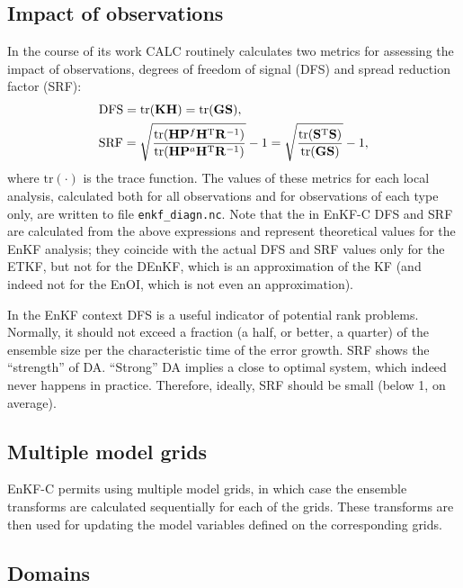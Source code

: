 \documentclass[11pt]{report}
\newcommand{\mb} {\mathbf}
\newcommand{\T}{^{\tiny \mathrm T}}
\begin{document}
\subsection{Impact of observations}
\label{sec:impact}

In the course of its work CALC routinely calculates two metrics for assessing the impact of observations, degrees of freedom of signal (DFS) and spread reduction factor (SRF):
\begin{align*}
  & \mathrm{DFS} = \mathrm{tr}(\mb K \mb H) = \mathrm{tr}(\mb G \mb S), \\
  & \mathrm{SRF} = \sqrt{\frac{\mathrm{tr}(\mb H \mb P^f \mb H\T \mb R^{-1})}{\mathrm{tr}(\mb H \mb P^a \mb H\T \mb R^{-1})}} - 1 = \sqrt{\frac{\mathrm{tr}(\mb S\T \mb S)}{\mathrm{tr}(\mb G \mb S)}} - 1,
\end{align*}
where $\mathrm{tr}(\cdot)$ is the trace function.
The values of these metrics for each local analysis, calculated both for all observations and for observations of each type only, are written to file \verb|enkf_diagn.nc|.
Note that the in EnKF-C DFS and SRF are calculated from the above expressions and represent theoretical values for the EnKF analysis; they coincide with the actual DFS and SRF values only for the ETKF, but not for the DEnKF, which is an approximation of the KF (and indeed not for the EnOI, which is not even an approximation).

In the EnKF context DFS is a useful indicator of potential rank problems.
Normally, it should not exceed a fraction (a half, or better, a quarter) of the ensemble size per the characteristic time of the error growth.
SRF shows the ``strength'' of DA.
``Strong'' DA implies a close to optimal system, which indeed never happens in practice.
Therefore, ideally, SRF should be small (below 1, on average).

\subsection{Multiple model grids}

EnKF-C permits using multiple model grids, in which case the ensemble transforms are calculated sequentially for each of the grids.
These transforms are then used for updating the model variables defined on the corresponding grids.

\subsection{Domains}
\label{sec:domains}
\end{document}
